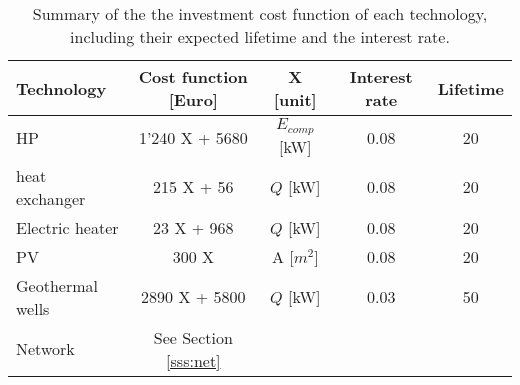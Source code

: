 \begin{table}[htp]
	\centering
	\caption{Summary of the the investment cost function of each technology, including their expected lifetime and the interest rate.}
	\label{tab:ic}
\begin{tabular}{lcccc} \toprule
	\textbf{Technology} & Cost function [Euro] & X  [unit]       & Interest rate & Lifetime \\ \midrule
	HP                  & 1'240 X + 5680       & $E_{comp}$ [kW] & 0.08                              & 20                           \\
	heat exchanger      & 215 X + 56          & $Q$ [kW]        & 0.08                              & 20                           \\
 	Electric heater		& 23 X + 968		  &	$Q$ [kW] 		 & 0.08								& 20						   \\
	PV                  & 300 X                & A [$m^{2}$]     & 0.08                              & 20                           \\
	Geothermal wells    & 2890 X + 5800        & $Q$ [kW]        & 0.03                              & 50                  			 \\
	Network				& See Section \ref{sss:net}		&		 &									 &					    \\ \bottomrule     
\end{tabular}
\end{table}